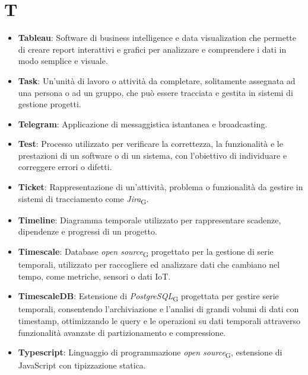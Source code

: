 \section*{T}  
\begin{itemize}
    \item \textbf{Tableau}: Software di business intelligence e data visualization che permette di creare report interattivi e grafici per analizzare e comprendere i dati in modo semplice e visuale.
    \item \textbf{Task}: Un'unità di lavoro o attività da completare, solitamente assegnata ad una persona o ad un gruppo, che può essere tracciata e gestita in sistemi di gestione progetti.
    \item \textbf{Telegram}: Applicazione di messaggistica istantanea e broadcasting.
    \item \textbf{Test}: Processo utilizzato per verificare la correttezza, la funzionalità e le prestazioni di un software o di un sistema, con l'obiettivo di individuare e correggere errori o difetti.
    \item \textbf{Ticket}: Rappresentazione di un’attività, problema o funzionalità da gestire in sistemi di tracciamento come \textit{Jira}\textsubscript{G}.
    \item \textbf{Timeline}: Diagramma temporale utilizzato per rappresentare scadenze, dipendenze e progressi di un progetto.
    \item \textbf{Timescale}: Database \textit{open source}\textsubscript{G} progettato per la gestione di serie temporali, utilizzato per raccogliere ed analizzare dati che cambiano nel tempo, come metriche, sensori o dati IoT.
    \item \textbf{TimescaleDB}: Estensione di \textit{PostgreSQL}\textsubscript{G} progettata per gestire serie temporali, consentendo l'archiviazione e l'analisi di grandi volumi di dati con timestamp, ottimizzando le query e le operazioni su dati temporali attraverso funzionalità avanzate di partizionamento e compressione.
    \item \textbf{Typescript}: Linguaggio di programmazione \textit{open source}\textsubscript{G}, estensione di JavaScript con tipizzazione statica.
\end{itemize}
